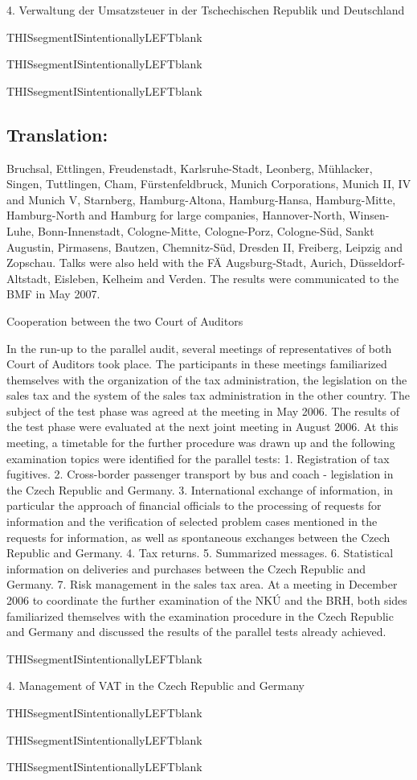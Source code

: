 \documentclass[10pt]{article}
\begin{document}
4. Verwaltung der Umsatzsteuer in der Tschechischen Republik und Deutschland



THISsegmentISintentionallyLEFTblank



THISsegmentISintentionallyLEFTblank



THISsegmentISintentionallyLEFTblank



\pagebreak

\subsection*{Translation:}

Bruchsal, Ettlingen, Freudenstadt, Karlsruhe-Stadt, Leonberg, Mühlacker, Singen, Tuttlingen, Cham, Fürstenfeldbruck, Munich Corporations, Munich II, IV and Munich V, Starnberg, Hamburg-Altona, Hamburg-Hansa, Hamburg-Mitte, Hamburg-North and Hamburg for large companies, Hannover-North, Winsen-Luhe, Bonn-Innenstadt, Cologne-Mitte, Cologne-Porz, Cologne-Süd, Sankt Augustin, Pirmasens, Bautzen, Chemnitz-Süd, Dresden II, Freiberg, Leipzig and Zopschau.
Talks were also held with the FÄ Augsburg-Stadt, Aurich, Düsseldorf-Altstadt, Eisleben, Kelheim and Verden.
The results were communicated to the BMF in May 2007.


Cooperation between the two Court of Auditors

In the run-up to the parallel audit, several meetings of representatives of both Court of Auditors took place.
The participants in these meetings familiarized themselves with the organization of the tax administration, the legislation on the sales tax and the system of the sales tax administration in the other country.
The subject of the test phase was agreed at the meeting in May 2006.
The results of the test phase were evaluated at the next joint meeting in August 2006.
At this meeting, a timetable for the further procedure was drawn up and the following examination topics were identified for the parallel tests: 1.
Registration of tax fugitives.
2.
Cross-border passenger transport by bus and coach - legislation in the Czech Republic and Germany.
3. International exchange of information, in particular the approach of financial officials to the processing of requests for information and the verification of selected problem cases mentioned in the requests for information, as well as spontaneous exchanges between the Czech Republic and Germany.
4. Tax returns.
5.
Summarized messages.
6.
Statistical information on deliveries and purchases between the Czech Republic and Germany.
7. Risk management in the sales tax area.
At a meeting in December 2006 to coordinate the further examination of the NKÚ and the BRH, both sides familiarized themselves with the examination procedure in the Czech Republic and Germany and discussed the results of the parallel tests already achieved.


THISsegmentISintentionallyLEFTblank



4. Management of VAT in the Czech Republic and Germany



THISsegmentISintentionallyLEFTblank



THISsegmentISintentionallyLEFTblank



THISsegmentISintentionallyLEFTblank
\end{document}
